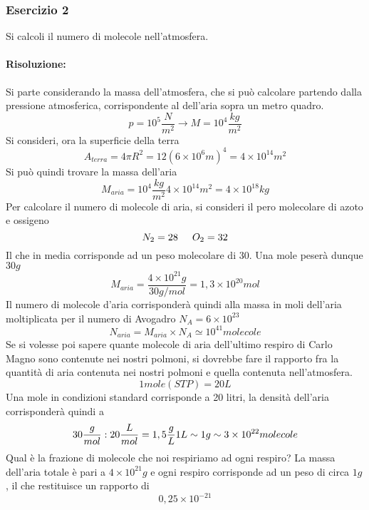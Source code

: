 \newpage
\subsubsection{Esercizio 2}
Si calcoli il numero di molecole nell'atmosfera.

\paragraph{Risoluzione:}
Si parte considerando la massa dell'atmosfera, che si può calcolare partendo dalla pressione atmosferica, corrispondente al dell'aria sopra un metro quadro.
\begin{equation}
p=10^5\frac{N}{m^2}\longrightarrow M=10^4\frac{kg}{m^2}
\end{equation}
Si consideri, ora la superficie della terra 
\begin{equation}
A_{terra}=4\pi R^2=12(6\times10^6m)^4=4\times10^14m^2
\end{equation}
Si può quindi trovare la massa dell'aria
\begin{equation}
M_{aria}=10^4\frac{kg}{m^2}4\times10^{14}m^2=4\times10^{18}kg
\end{equation}
Per calcolare il numero di molecole di aria, si consideri il pero molecolare di azoto e ossigeno
\begin{equation}
N_2=28\hspace{0,5cm}O_2=32
\end{equation}
Il che in media corrisponde ad un peso molecolare di $30$.
Una mole peserà dunque $30g$
\begin{equation}
M_{aria}=\frac{4\times10^21g}{30g/mol}=1,3\times10^{20}mol
\end{equation}
Il numero di molecole d'aria corrisponderà quindi alla massa in moli dell'aria moltiplicata per il numero di Avogadro $N_A=6\times10^{23}$
\begin{equation}
N_{aria}=M_{aria}\times N_A\simeq 10^41molecole
\end{equation}
Se si volesse poi sapere quante molecole di aria dell'ultimo respiro di Carlo Magno sono contenute nei nostri polmoni, si dovrebbe fare il rapporto fra la quantità di aria contenuta nei nostri polmoni e quella contenuta nell'atmosfera.
\begin{equation}
1mole (STP)=20L
\end{equation}
Una mole in condizioni standard corrisponde a 20 litri, la densità dell'aria corrisponderà quindi a 
\begin{equation}
30\frac{g}{mol}:20\frac{L}{mol}=1,5\frac{g}{L}\\
1L\sim 1g\sim 3\times 10^{22}molecole
\end{equation}
Qual è la frazione di molecole che noi respiriamo ad ogni respiro?
La massa dell'aria totale è pari a $4\times 10^21g$ e ogni respiro corrisponde ad un peso di circa $1g$, il che restituisce un rapporto di
\begin{equation}
0,25\times 10^{-21}
\end{equation}

